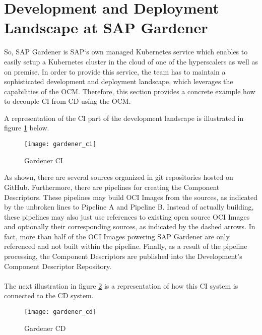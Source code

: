 \section{Development and Deployment Landscape at SAP Gardener} \label{sec:Development and Deployment Landscape at SAP Gardener}
So, SAP Gardener is SAP`s own managed Kubernetes service which enables to easily setup a Kubernetes cluster in the cloud of one of the hyperscalers as well as on premise. In order to provide this service, the team has to maintain a sophisticated development and deployment landscape, which leverages the capabilities of the OCM. Therefore, this section provides a concrete example how to decouple CI from CD using the OCM.\par
A representation of the CI part of the development landscape is illustrated in figure \ref{fig:GardenerCI} below.

\begin{figure}[H]
	\centering
	\texttt{[image: gardener\_ci]}
	\caption[Gardener CI]{Gardener CI }
	\label{fig:GardenerCI}
\end{figure}

As shown, there are several sources organized in git repositories hosted on GitHub. Furthermore, there are pipelines for creating the Component Descriptors. These pipelines may build OCI Images from the sources, as indicated by the unbroken lines to Pipeline A and Pipeline B. Instead of actually building, these pipelines may also just use references to existing open source OCI Images and optionally their corresponding sources, as indicated by the dashed arrows. In fact, more than half of the OCI Images powering SAP Gardener are only referenced and not built within the pipeline. Finally, as a result of the pipeline processing, the Component Descriptors are published into the Development's Component Descriptor Repository.\\\\
The next illustration in figure \ref{fig:GardenerCD} is a representation of how this CI system is connected to the CD system.

\begin{figure}[H]
	\centering
	\texttt{[image: gardener\_cd]}
	\caption[Gardener CD]{Gardener CD }
	\label{fig:GardenerCD}
\end{figure}
 
